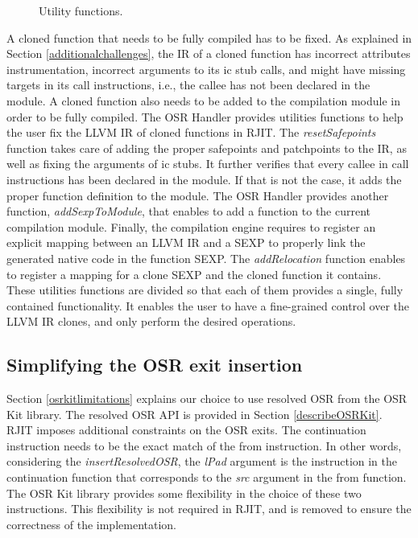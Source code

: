 \begin{figure}[h]
\caption{Utility functions.}
\label{fig:utilityfunctions}
\end{figure}

A cloned function that needs to be fully compiled has to be fixed.
As explained in Section \ref{additionalchallenges}, the IR of a cloned function has incorrect attributes instrumentation, incorrect arguments to its ic stub calls, and might have missing targets in its call instructions, i.e., the callee has not been declared in the module.
A cloned function also needs to be added to the compilation module in order to be fully compiled.
The OSR Handler provides utilities functions to help the user fix the LLVM IR of cloned functions in RJIT. 
The \textit{resetSafepoints} function takes care of adding the proper safepoints and patchpoints to the IR, as well as fixing the arguments of ic stubs.
It further verifies that every callee in call instructions has been declared in the module. 
If that is not the case, it adds the proper function definition to the module.
The OSR Handler provides another function, \textit{addSexpToModule}, that enables to add a function to the current compilation module.
Finally, the compilation engine requires to register an explicit mapping between an LLVM IR and a SEXP to properly link the generated native code in the function SEXP.
The \textit{addRelocation} function enables to register a mapping for a clone SEXP and the cloned function it contains.
These utilities functions are divided so that each of them provides a single, fully contained functionality. 
It enables the user to have a fine-grained control over the LLVM IR clones, and only perform the desired operations.\\

\subsection{Simplifying the OSR exit insertion}

Section \ref{osrkitlimitations} explains our choice to use resolved OSR from the OSR Kit\cite{OSRKit} library.
The resolved OSR API is provided in Section \ref{describeOSRKit}.\\

RJIT imposes additional constraints on the OSR exits. 
The continuation instruction needs to be the exact match of the from instruction.
In other words, considering the \textit{insertResolvedOSR}, the \textit{lPad} argument is the instruction in the continuation function that corresponds to the \textit{src} argument in the from function.
The OSR Kit library provides some flexibility in the choice of these two instructions. 
This flexibility is not required in RJIT, and is removed to ensure the correctness of the implementation.\\

